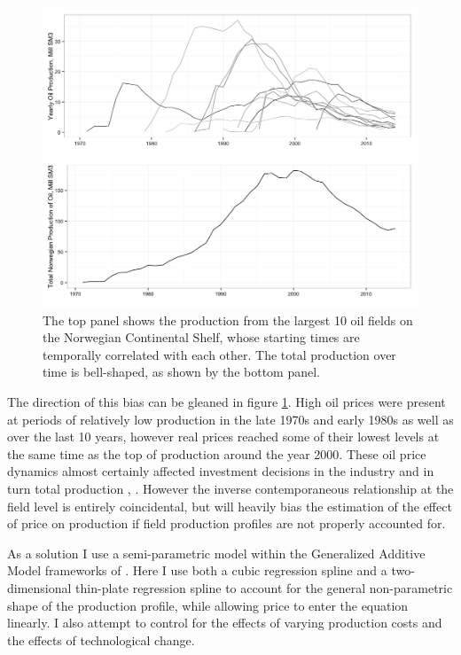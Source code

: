 \documentclass[12pt]{article}
\begin{document}
\begin{figure}
	\includegraphics[width=1\textwidth]{figures/oil_decline.png}
	\caption{The top panel shows the production from the largest 10 oil fields on the Norwegian Continental Shelf, whose starting times are temporally correlated with each other.  The total production over time is bell-shaped, as shown by the bottom panel.}
	\label{oil_decline}
\end{figure}

The direction of this bias can be gleaned in figure \ref{oil_decline}.  High oil prices were present at periods of relatively low production in the late 1970s and early 1980s as well as over the last 10 years, however real prices reached some of their lowest levels at the same time as the top of production around the year 2000. These oil price dynamics almost certainly affected investment decisions in the industry and in turn total production \citep{osmundsen_is_2007}, \citep{aune_financial_2010}. However the inverse contemporaneous relationship at the field level is entirely coincidental, but will heavily bias the estimation of the effect of price on production if field production profiles are not properly accounted for. 

As a solution I use a semi-parametric model within the Generalized Additive Model frameworks of \cite{hastie_generalized_1990}.  Here I use both a cubic regression spline and a two-dimensional thin-plate regression spline to account for the general non-parametric shape of the production profile, while allowing price to enter the equation linearly. I also attempt to control for the effects of varying production costs and the effects of technological change.
\end{document}
